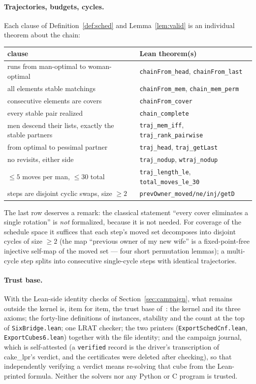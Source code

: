 \documentclass[11pt]{article}
\begin{document}
\paragraph{Trajectories, budgets, cycles.} Each clause of
Definition~\ref{def:sched} and Lemma~\ref{lem:valid} is an individual theorem about
the chain:
\begin{center}\small
\begin{tabular}{ll}
\toprule
clause & Lean theorem(s)\\
\midrule
runs from man-optimal to woman-optimal & \texttt{chainFrom\_head}, \texttt{chainFrom\_last}\\
all elements stable matchings & \texttt{chainFrom\_mem}, \texttt{chain\_mem\_perm}\\
consecutive elements are covers & \texttt{chainFrom\_cover}\\
every stable pair realized & \texttt{chain\_complete}\\
men descend their lists, exactly the stable partners & \texttt{traj\_mem\_iff}, \texttt{traj\_rank\_pairwise}\\
from optimal to pessimal partner & \texttt{traj\_head}, \texttt{traj\_getLast}\\
no revisits, either side & \texttt{traj\_nodup}, \texttt{wtraj\_nodup}\\
$\le 5$ moves per man, $\le 30$ total & \texttt{traj\_length\_le}, \texttt{total\_moves\_le\_30}\\
steps are disjoint cyclic swaps, size $\ge 2$ & \texttt{prevOwner\_moved/ne/inj/getD}\\
\bottomrule
\end{tabular}
\end{center}
The last row deserves a remark: the classical statement ``every cover eliminates a
single rotation'' is \emph{not} formalized, because it is not needed. For coverage
of the schedule space it suffices that each step's moved set decomposes into
disjoint cycles of size $\ge 2$ (the map ``previous owner of my new wife'' is a
fixed-point-free injective self-map of the moved set --- four short permutation
lemmas); a multi-cycle step splits into consecutive single-cycle steps with
identical trajectories.

\paragraph{Trust base.} With the Lean-side identity checks of Section~\ref{sec:campaign}, what
remains outside the kernel is, item for item, the trust base of~\cite{f5paper}: the kernel and
its three axioms; the forty-line definitions of instances, stability and the count at the top
of \texttt{SixBridge.lean}; one LRAT checker; the two printers
(\texttt{ExportSchedCnf.lean}, \texttt{ExportCubes6.lean}) together with the file identity; and
the campaign journal, which is self-attested (a \texttt{verified} record is the driver's
transcription of cake\_lpr's verdict, and the certificates were deleted after checking), so that
independently verifying a verdict means re-solving that cube from the Lean-printed formula.
Neither the solvers nor any Python or C program is trusted.
\end{document}
